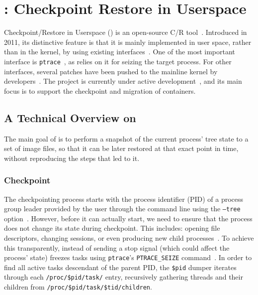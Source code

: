 \section{\criu: Checkpoint Restore in Userspace} \label{sec:bg-criu}

Checkpoint/Restore in Userspace (\criu) is an open-source C/R tool~\cite{criu-main-page}.
Introduced in 2011, its distinctive feature is that it is mainly implemented in user space, rather than in the kernel, by using existing interfaces~\cite{Reber2016}.
One of the most important interface is \texttt{ptrace}~\cite{ptrace-manpage}, as \criu relies on it for seizing the target process.
For other interfaces, several patches have been pushed to the mainline kernel by \criu developers~\cite{criu-kernel-patches}.
The project is currently under active development~\cite{criu-github}, and its main focus is to support the checkpoint and migration of containers.

\subsection{A Technical Overview on \criu}

The main goal of \criu is to perform a snapshot of the current process' tree state to a set of image files, so that it can be later restored at that exact point in time, without reproducing the steps that led to it.

\subsubsection*{Checkpoint}

The checkpointing process starts with the process identifier (PID) of a process group leader provided by the user through the command line using the \texttt{--tree} option~\cite{criu-checkpoint}.
However, before it can actually start, we need to ensure that the process does not change its state during checkpoint.
This includes: opening file descriptors, changing sessions, or even producing new child processes~\cite{criu-freeze}.
To achieve this transparently, instead of sending a stop signal (which could affect the process' state) \criu freezes tasks using \texttt{ptrace}'s \texttt{PTRACE\_SEIZE} command~\cite{ptrace-manpage}.
In order to find all active tasks descendant of the parent PID, the \texttt{\$pid} dumper iterates through each \texttt{/proc/\$pid/task/} entry, recursively gathering threads and their children from \texttt{/proc/\$pid/task/\$tid/children}.

